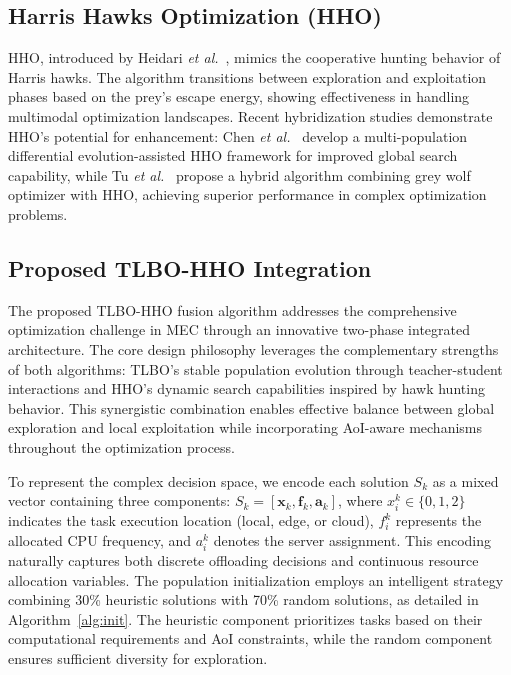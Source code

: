 \documentclass[conference]{IEEEtran}
\begin{document}
\subsection{Harris Hawks Optimization (HHO)}
HHO, introduced by Heidari \textit{et al.}~\cite{heidari2019harris}, mimics the cooperative hunting behavior of Harris hawks. The algorithm transitions between exploration and exploitation phases based on the prey's escape energy, showing effectiveness in handling multimodal optimization landscapes. Recent hybridization studies demonstrate HHO's potential for enhancement: Chen \textit{et al.}~\cite{chen2020multi} develop a multi-population differential evolution-assisted HHO framework for improved global search capability, while Tu \textit{et al.}~\cite{tu2023hybrid} propose a hybrid algorithm combining grey wolf optimizer with HHO, achieving superior performance in complex optimization problems.

\subsection{Proposed TLBO-HHO Integration}
The proposed TLBO-HHO fusion algorithm addresses the comprehensive optimization challenge in MEC through an innovative two-phase integrated architecture. The core design philosophy leverages the complementary strengths of both algorithms: TLBO's stable population evolution through teacher-student interactions and HHO's dynamic search capabilities inspired by hawk hunting behavior. This synergistic combination enables effective balance between global exploration and local exploitation while incorporating AoI-aware mechanisms throughout the optimization process.

To represent the complex decision space, we encode each solution $S_k$ as a mixed vector containing three components: $S_k = [\mathbf{x}_k, \mathbf{f}_k, \mathbf{a}_k]$, where $x_i^k \in \{0, 1, 2\}$ indicates the task execution location (local, edge, or cloud), $f_i^k$ represents the allocated CPU frequency, and $a_i^k$ denotes the server assignment. This encoding naturally captures both discrete offloading decisions and continuous resource allocation variables. The population initialization employs an intelligent strategy combining 30\% heuristic solutions with 70\% random solutions, as detailed in Algorithm~\ref{alg:init}. The heuristic component prioritizes tasks based on their computational requirements and AoI constraints, while the random component ensures sufficient diversity for exploration.
\end{document}
